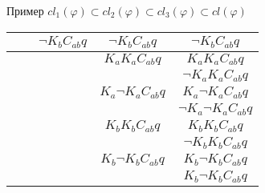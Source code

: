 {\begin{exampleblock}{Пример $cl_1(\varphi) \subset cl_2(\varphi) \subset cl_3 (\varphi) \subset cl(\varphi)$}
{\begin{tabular}{|c|c|c|c|c|}
                        &                         & $\neg K_bC_{ab}q$               & $\neg K_bC_{ab}q$               & $\neg K_bC_{ab}q$               \\ \hline
                        &                         &                                 & $K_a K_a C_{ab}q$               & $K_a K_a C_{ab}q$               \\ \hline
                        &                         &                                 &                                 & $\neg K_a K_a C_{ab}q$          \\ \hline
                        &                         &                                 & $K_a \neg K_a C_{ab}q$          & $K_a \neg K_a C_{ab}q$          \\ \hline
                        &                         &                                 &                                 & $\neg K_a \neg K_a C_{ab}q$     \\ \hline
                        &                         &                                 & $K_b K_b C_{ab}q$               & $K_b K_b C_{ab}q$               \\ \hline
                        &                         &                                 &                                 & $\neg K_b  K_b C_{ab}q$         \\ \hline
                        &                         &                                 & $K_b \neg K_b C_{ab}q$          & $K_b \neg K_b C_{ab}q$          \\ \hline
                        &                         &                                 &                                 & $K_b \neg K_b C_{ab}q$          \\ \hline
\end{tabular}
}	
\end{exampleblock}
}




